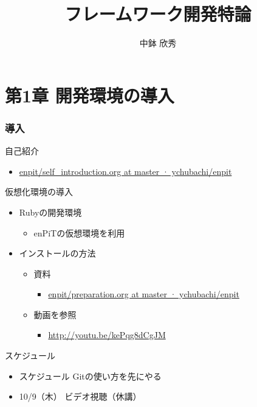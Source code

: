 \documentclass[t, aspectratio=169]{beamer}
\date{\insertpart}
\institute[AIIT]{産業技術大学院大学(AIIT)}
\author{中鉢 欣秀}
\date{}
\title{フレームワーク開発特論}
\begin{document}
\maketitle

\part{第1章 開発環境の導入}
\label{sec-1}
\section{導入}
\label{sec-1-1}
\begin{frame}[label=sec-1-1-1]{自己紹介}
\begin{itemize}
\item \href{https://github.com/ychubachi/enpit/blob/master/slides/self_introduction.org}{enpit/self\_introduction.org at master · ychubachi/enpit}
\end{itemize}
\end{frame}
\begin{frame}[label=sec-1-1-2]{仮想化環境の導入}
\begin{itemize}
\item Rubyの開発環境
\begin{itemize}
\item enPiTの仮想環境を利用
\end{itemize}
\item インストールの方法
\begin{itemize}
\item 資料
\begin{itemize}
\item \href{https://github.com/ychubachi/enpit/blob/master/slides/preparation.org}{enpit/preparation.org at master · ychubachi/enpit}
\end{itemize}
\item 動画を参照
\begin{itemize}
\item \url{http://youtu.be/kePqg8dCgJM}
\end{itemize}
\end{itemize}
\end{itemize}
\end{frame}
\begin{frame}[label=sec-1-1-3]{スケジュール}
\begin{itemize}
\item スケジュール
Gitの使い方を先にやる
\item 10/9（木） ビデオ視聴（休講）
\end{itemize}
\end{frame}
\end{document}
